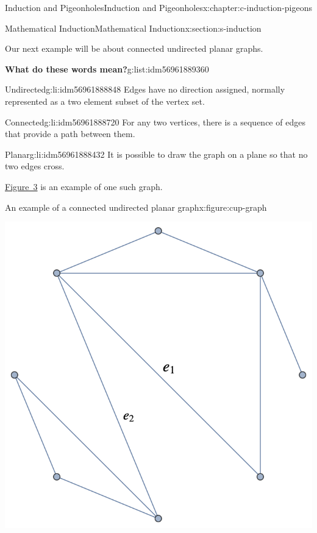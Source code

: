\documentclass[twoside,10pt,]{book}
\numberwithin{equation}{section}
\begin{document}
\begin{chapterptx}{Induction and Pigeonholes}{}{Induction and Pigeonholes}{}{}{x:chapter:c-induction-pigeons}
\begin{sectionptx}{Mathematical Induction}{}{Mathematical Induction}{}{}{x:section:s-induction}
\par
Our next example will be about connected undirected planar graphs.%
\begin{listptx}{\textbf{What do these words mean?}}{g:list:idm56961889360}{}%
%
\begin{descriptionlist}
\begin{dlimedium}{Undirected}{g:li:idm56961888848}%
Edges have no direction assigned, normally represented as a two element subset of the vertex set.%
\end{dlimedium}%
\begin{dlimedium}{Connected}{g:li:idm56961888720}%
For any two vertices, there is a sequence of edges that provide a path between them.%
\end{dlimedium}%
\begin{dlimedium}{Planar}{g:li:idm56961888432}%
It is possible to draw the graph on a plane so that no two edges cross.%
\end{dlimedium}%
\end{descriptionlist}
\end{listptx}%
\hyperref[x:figure:cup-graph]{Figure~3} is an example of one such graph.%
\begin{figureptx}{An example of a connected undirected planar graph}{x:figure:cup-graph}{}%
\begin{image}{0}{1}{0}%
\includegraphics[width=\linewidth]{images/cup-graph.png}

\end{image}
\end{figureptx}
\end{sectionptx}
\end{chapterptx}
\end{document}
